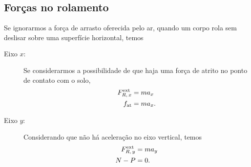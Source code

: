 \subsection{Forças no rolamento}

Se ignorarmos a força de arrasto oferecida pelo ar, quando um corpo rola sem deslisar sobre uma superfície horizontal, temos
\begin{description}
    \item[Eixo $x$:] Se considerarmos a possibilidade de que haja uma força de atrito no ponto de contato com o solo,
        \begin{align}
            F_{R,\,x}^{\rm{ext}} &= m a_x \\
            f_{\rm{at}} &= m a_x.
        \end{align}
        
    \item[Eixo $y$:] Considerando que não há aceleração no eixo vertical, temos
    \begin{align}
        F_{R,\,y}^{\rm{ext}} &= m a_y \\
        N - P &= 0.
    \end{align}
\end{description}

